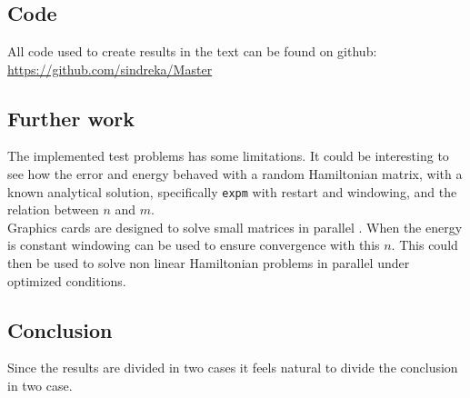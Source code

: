 \chapter{  }
\section{Code}
All code used to create results in the text can be found on github: \\
\url{https://github.com/sindreka/Master}
\section{Further work}
The implemented test problems has some limitations. It could be interesting to see how the error and energy behaved with a random Hamiltonian matrix, with a known analytical solution, specifically \texttt{expm} with restart and windowing, and the relation between $n$ and $m$. \\

Graphics cards are designed to solve small matrices in parallel \cite{graphics}. When the energy is constant windowing can be used to ensure convergence with this $n$. This could then be used to solve non linear Hamiltonian problems in parallel under optimized conditions. \\



\section{Conclusion}
%
Since the results are divided in two cases it feels natural to divide the conclusion in two case.
